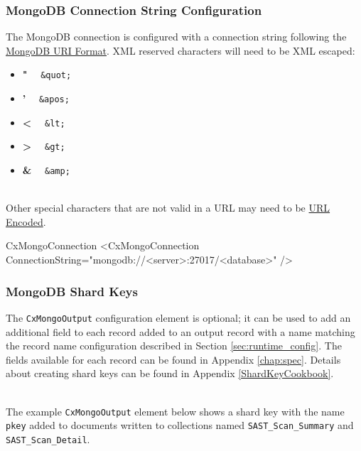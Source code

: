 \subsubsection{MongoDB Connection String Configuration}

The MongoDB connection is configured with a connection string following the \href{https://docs.mongodb.com/manual/reference/connection-string/}{MongoDB URI Format}.
XML reserved characters will need to be XML escaped:

\begin{itemize}
    \item \textbf{"} \ \faArrowRight \ \texttt{\&quot;}
    \item \textbf{'} \ \faArrowRight \ \texttt{\&apos;}
    \item \textbf{<} \ \faArrowRight \ \texttt{\&lt;}
    \item \textbf{>} \ \faArrowRight \ \texttt{\&gt;}
    \item \textbf{\&} \ \faArrowRight \ \texttt{\&amp;}
\end{itemize}

\noindent\\Other special characters that are not valid in a URL may need to be \href{https://www.w3schools.com/tags/ref_urlencode.ASP}{URL Encoded}.\\

\begin{xml}{CxMongoConnection}{\expandsenv\encrypts}{}
<CxMongoConnection
    ConnectionString="mongodb://<server>:27017/<database>"
/>
\end{xml}

\subsubsection{MongoDB Shard Keys}

The \texttt{CxMongoOutput} configuration element is optional; it can be used to add an additional field to each record
added to an output record with a name matching the record name configuration described in Section \ref{sec:runtime_config}.  The fields
available for each record can be found in Appendix \ref{chap:spec}. Details about creating shard keys can be found in Appendix \ref{ShardKeyCookbook}.

\noindent\\The example \texttt{CxMongoOutput} element below shows a shard key with the name \texttt{pkey} added to documents
written to collections named \texttt{SAST\_Scan\_Summary} and \texttt{SAST\_Scan\_Detail}.

